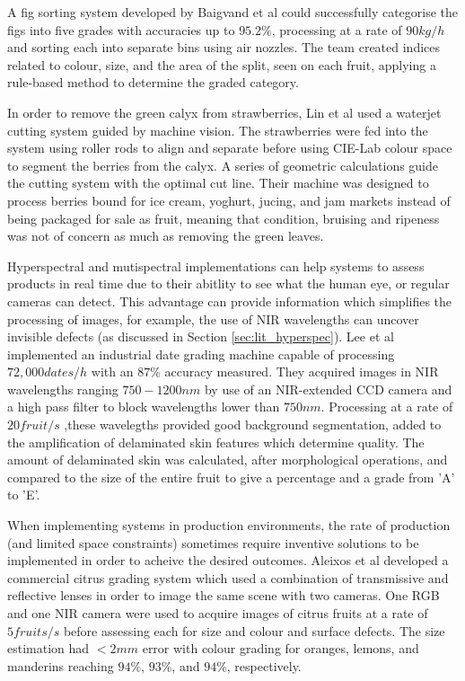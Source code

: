 \documentclass[fleqn,twoside]{article}
\begin{document}
A fig sorting system developed by Baigvand et al \cite{baigvand} could successfully categorise the figs into five grades with accuracies up to $95.2\%$, processing at a rate of $90kg/h$ and sorting each into separate bins using air nozzles. The team created indices related to colour, size, and the area of the split, seen on each fruit, applying a rule-based method to determine the graded category. 

In order to remove the green calyx from strawberries, Lin et al \cite{lin} used a waterjet cutting system guided by machine vision. The strawberries were fed into the system using roller rods to align and separate before using CIE-Lab colour space to segment the berries from the calyx. A series of geometric calculations guide the cutting system with the optimal cut line. Their machine was designed to process berries bound for ice cream, yoghurt, jucing, and jam markets instead of being packaged for sale as fruit, meaning that condition, bruising and ripeness was not of concern as much as removing the green leaves.

Hyperspectral and mutispectral implementations can help systems to assess products in real time due to their abitlity to see what the human eye, or regular cameras can detect. This advantage can provide information which simplifies the processing of images, for example, the use of NIR wavelengths can uncover invisible defects (as discussed in Section \ref{sec:lit_hyperspec}). Lee et al \cite{lee} implemented an industrial date grading machine capable of processing $72,000 dates/h$ with an $87\%$ accuracy measured. They acquired images in NIR wavelengths ranging $750-1200nm$ by use of an NIR-extended CCD camera and a high pass filter to block wavelengths lower than $750nm$. Processing at a rate of $20 fruit/s$ ,these wavelegths provided good background segmentation, added to the amplification of delaminated skin features which determine quality. The amount of delaminated skin was calculated, after morphological operations, and compared to the size of the entire fruit to give a percentage and a grade from 'A' to 'E'. 

When implementing systems in production environments, the rate of production (and limited space constraints) sometimes require inventive solutions to be implemented in order to acheive the desired outcomes. Aleixos et al \cite{aleixos} developed a commercial citrus grading system which used a combination of transmissive and reflective lenses in order to image the same scene with two cameras. One RGB and one NIR camera were used to acquire images of citrus fruits at a rate of $5 fruits/s$ before assessing each for size and colour and surface defects. The size estimation had $<2mm$ error with colour grading for oranges, lemons, and manderins reaching $94\%$, $93\%$, and $94\%$, respectively.
\end{document}

